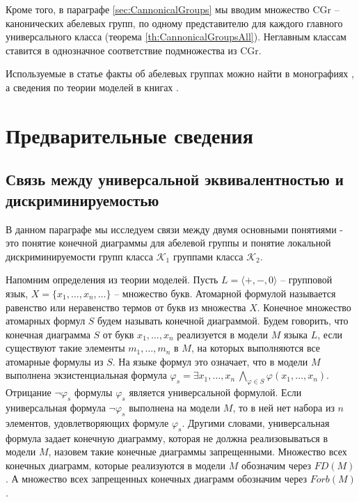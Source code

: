 \documentclass[a4paper,11pt,twoside]{article}
\def\K{{\mathcal{K}}}
\def\CG{{\mathrm{CGr}}}
\begin{document}
Кроме того, в параграфе \ref{sec:CannonicalGroups} мы вводим множество $\CG$ -- канонических абелевых групп, по одному представителю для каждого главного универсального класса (теорема \ref{th:CannonicalGroupsAll}). Неглавным классам ставится в однозначное соответствие подмножества из $\CG$.


Используемые в статье факты об абелевых группах можно найти в монографиях \cite{Fuchs1, Fuchs2}, а сведения по теории моделей в книгах \cite{Ershov, Hodges, DM}.


\section{Предварительные сведения}

\subsection{Связь между универсальной эквивалентностью и дискриминируемостью}

В данном параграфе мы исследуем связи между двумя основными понятиями - это понятие конечной диаграммы для абелевой группы и понятие локальной дискриминируемости групп класса $\K_1$ группами класса $\K_2$.

Напомним определения из теории моделей. Пусть $L = \langle +, -, 0\rangle$ -- групповой язык, $X = \{x_1, \ldots, x_n, \ldots\}$ -- множество букв. Атомарной формулой называется равенство или неравенство термов от букв из множества $X$. Конечное множество атомарных формул $S$ будем называть конечной диаграммой. Будем говорить, что конечная диаграмма $S$ от букв $x_1, \ldots, x_n$ реализуется в модели $M$ языка $L$, если существуют такие элементы $m_1, \ldots, m_n$ в $M$, на которых выполняются все атомарные формулы из $S$. На языке формул это означает, что в модели $M$ выполнена экзистенциальная формула $\varphi_s = \exists x_1, \ldots, x_n \ \bigwedge\limits_{\varphi \in S} \varphi(x_1, \ldots, x_n)$. Отрицание $\neg\varphi_s$ формулы $\varphi_s$ является универсальной формулой. Если универсальная формула $\neg\varphi_s$ выполнена на модели $M$, то в ней нет набора из $n$ элементов, удовлетворяющих формуле $\varphi_s$. 
Другими словами, универсальная формула задает конечную диаграмму, которая не должна реализовываться в модели $M$, назовем такие конечные диаграммы запрещенными. Множество всех конечных диаграмм, которые реализуются в модели $M$ обозначим через $FD(M)$. А множество всех запрещенных конечных диаграмм обозначим через $Forb(M)$.
\end{document}
